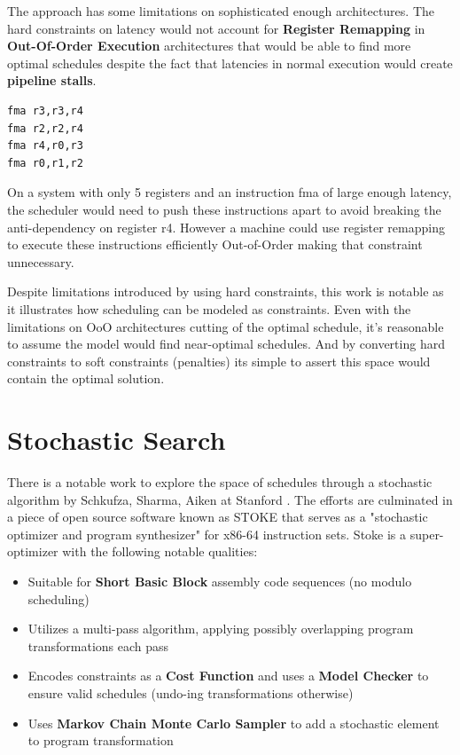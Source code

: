 \documentclass[12pt]{report}
\def\mytitle{??? Program Code ???}
\begin{document}
The approach has some limitations on sophisticated enough architectures. The
hard constraints on latency would not account for \textbf{Register Remapping} in
\textbf{Out-Of-Order Execution} architectures that would be able to find more
optimal schedules despite the fact that latencies in normal execution would
create \textbf{pipeline stalls}.

\def\mytitle{{\sc Assembly Code Example Requiring Register Renaming for Optimal Scheduling \hspace{12em} \color{grey}{.} }}
\begin{verbatim}
fma r3,r3,r4
fma r2,r2,r4
fma r4,r0,r3
fma r0,r1,r2
\end{verbatim}
On a system with only 5 registers and an instruction fma of large enough
latency, the scheduler would need to push these instructions apart to avoid
breaking the anti-dependency on register r4. However a machine
could use register remapping to execute these instructions efficiently Out-of-Order
making that constraint unnecessary. 

Despite limitations introduced by using hard constraints, this work is
notable as it illustrates how scheduling can be modeled as constraints. Even
with the limitations on OoO architectures cutting of the optimal schedule,
it's reasonable to assume the model would find near-optimal schedules. And by
converting hard constraints to soft constraints (penalties) its simple to
assert this space would contain the optimal solution.

\section{Stochastic Search}
\label{sec:org8336ae0}
There is a notable work to explore the space of schedules through a
stochastic algorithm by Schkufza, Sharma, Aiken at Stanford
\parencite{Schkufza:2016:SPO:2886013.2863701}. The efforts are culminated in
a piece of open source software known as STOKE that serves as a "stochastic
optimizer and program synthesizer" for x86-64 instruction sets. Stoke is a
super-optimizer with the following notable qualities:

\begin{itemize}
\item Suitable for \textbf{Short Basic Block} assembly code sequences (no modulo scheduling)
\item Utilizes a multi-pass algorithm, applying possibly overlapping program
transformations each pass
\item Encodes constraints as a \textbf{Cost Function} and uses a \textbf{Model Checker} to
ensure valid schedules (undo-ing transformations otherwise)
\item Uses \textbf{Markov Chain Monte Carlo Sampler} to add a stochastic element to
program transformation
\end{itemize}
\end{document}
